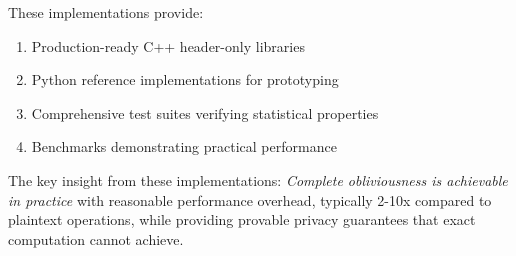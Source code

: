 These implementations provide:
\begin{enumerate}
\item Production-ready C++ header-only libraries
\item Python reference implementations for prototyping
\item Comprehensive test suites verifying statistical properties
\item Benchmarks demonstrating practical performance
\end{enumerate}

The key insight from these implementations: \textit{Complete obliviousness is achievable in practice} with reasonable performance overhead, typically 2-10x compared to plaintext operations, while providing provable privacy guarantees that exact computation cannot achieve.